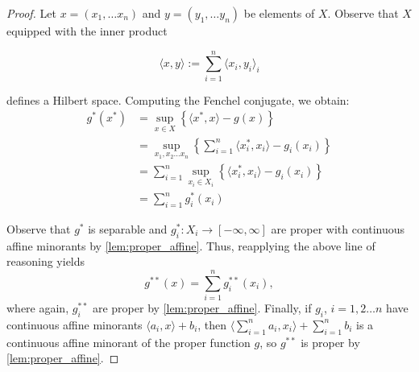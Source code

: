 \documentclass[11pt]{article}
\begin{document}
		\begin{comment}
		\textbf{Notes:}
		\begin{enumerate}
		\item Proof of separability of $g^{*}$ is adapted from \textcolor{red}{Proposition 13.30} of Bauschke ``Convex analysis and monotone operator theory in Hilbert Spaces.''
		
		\item We allow $\sup = +\infty$ since we are dealing with functions on the extended reals. This also means we do not need to worry about the sets $\{\langle x_i^{*}, x_i\rangle - g_{i}(x_i)\}$ being bounded above, hence additivity of the $\sup$ should always hold.  
		\end{enumerate}
		\end{comment}
	
	\begin{proof}
		Let $x = (x_1, \ldots x_n)$ and $y = (y_1, \ldots y_n)$ be elements of $X$. Observe that $X$ equipped with the inner product 
		
		\[	\langle x, y\rangle := \sum_{i=1}^{n} \langle x_{i}, y_{i}\rangle_{i}
				\]
				
		\noindent defines a Hilbert space. 	Computing the Fenchel conjugate, we obtain:
		\begin{align*}
			g^{*}(x^{*}) 
			& = \sup_{x\in X}\left\{ 
									\langle x^*, x\rangle - g(x)
												\right\} \\
			& = \sup_{x_1,x_2\ldots x_n} \left\{
										\sum_{i=1}^{n} \langle x^{*}_{i}, x_i\rangle - g_{i}(x_i)
												\right\}	\\
			& = \sum_{i=1}^{n}	\sup_{x_i\in X_i} \left\{\langle x^{*}_{i}, x_i\rangle - g_{i}(x_i)\right\} \\
			& = \sum_{i=1}^{n} g_{i}^{*}(x_i)					
			\end{align*}
			
			\noindent Observe that $g^{*}$ is separable and $g_{i}^{*}:X_{i}\to[-\infty, \infty]$ are proper with continuous affine minorants by \autoref{lem:proper_affine}. Thus, reapplying the above line of reasoning yields 
			\[	g^{**}(x) = \sum_{i=1}^{n} g_{i}^{**}(x_i),
			\]
			where again, $g^{**}_{i}$ are proper by \autoref{lem:proper_affine}. Finally, if $g_{i}$, $i=1,2\ldots n$ have continuous affine minorants $\langle a_{i}, x\rangle + b_{i}$, then $\langle \sum_{i=1}^{n}a_i, x_i\rangle + \sum_{i=1}^{n} b_{i}$ is a continuous affine minorant of the proper function $g$, so $g^{**}$ is proper by \autoref{lem:proper_affine}.
		\end{proof}
		\printbibliography
\end{document}
